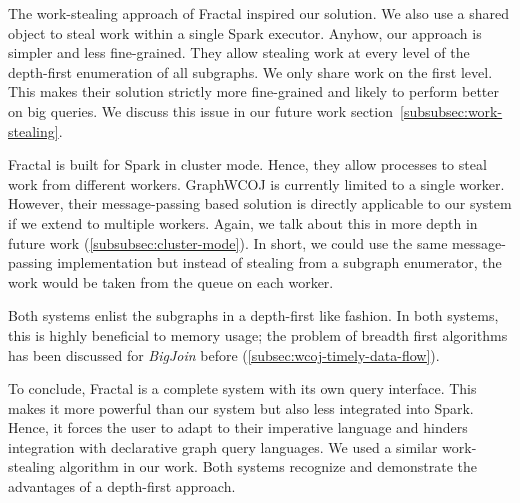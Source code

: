 The work-stealing approach of Fractal inspired our solution.
We also use a shared object to steal work within a single Spark executor.
Anyhow, our approach is simpler and less fine-grained.
They allow stealing work at every level of the depth-first enumeration of all subgraphs.
We only share work on the first level.
This makes their solution strictly more fine-grained and likely to perform better on big
queries.
We discuss this issue in our future work section~\ref{subsubsec:work-stealing}.

Fractal is built for Spark in cluster mode.
Hence, they allow processes to steal work from different workers.
GraphWCOJ is currently limited to a single worker.
However, their message-passing based solution is directly applicable to our system if
we extend to multiple workers.
Again, we talk about this in more depth in future work (\ref{subsubsec:cluster-mode}).
In short, we could use the same message-passing implementation but instead of stealing
from a subgraph enumerator, the work would be taken from the queue on each worker.

Both systems enlist the subgraphs in a depth-first like fashion.
In both systems, this is highly beneficial to memory usage;
the problem of breadth first algorithms has been discussed for \textit{BigJoin} before (\cref{subsec:wcoj-timely-data-flow}).

To conclude, Fractal is a complete system with its own query interface.
This makes it more powerful than our system but also less integrated into Spark.
Hence, it forces the user to adapt to their imperative language and hinders
integration with declarative graph query languages.
We used a similar work-stealing algorithm in our work.
Both systems recognize and demonstrate the advantages of a depth-first approach.



